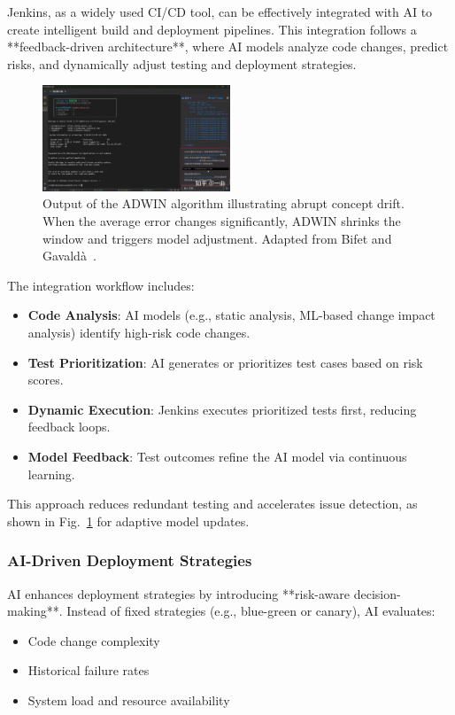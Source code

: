 \documentclass[manuscript,screen,review]{acmart}
\begin{document}
Jenkins, as a widely used CI/CD tool, can be effectively integrated with AI to create intelligent build and deployment pipelines. This integration follows a **feedback-driven architecture**, where AI models analyze code changes, predict risks, and dynamically adjust testing and deployment strategies.

\begin{figure}[H]
  \centering
  \includegraphics[width=0.5\textwidth]{picture/jenkins+ai+cursor.png}
  \caption{Output of the ADWIN algorithm illustrating abrupt concept drift. When the average error changes significantly, ADWIN shrinks the window and triggers model adjustment. Adapted from Bifet and Gavaldà~\cite{Bifet2007}.}
  \label{fig:adwin}
\end{figure}

The integration workflow includes:
\begin{itemize}
    \item \textbf{Code Analysis}: AI models (e.g., static analysis, ML-based change impact analysis) identify high-risk code changes.
    \item \textbf{Test Prioritization}: AI generates or prioritizes test cases based on risk scores.
    \item \textbf{Dynamic Execution}: Jenkins executes prioritized tests first, reducing feedback loops.
    \item \textbf{Model Feedback}: Test outcomes refine the AI model via continuous learning.
\end{itemize}

This approach reduces redundant testing and accelerates issue detection, as shown in Fig.~\ref{fig:adwin} for adaptive model updates.

\subsubsection{AI-Driven Deployment Strategies}

AI enhances deployment strategies by introducing **risk-aware decision-making**. Instead of fixed strategies (e.g., blue-green or canary), AI evaluates:
\begin{itemize}
    \item Code change complexity
    \item Historical failure rates
    \item System load and resource availability
\end{itemize}
\end{document}
